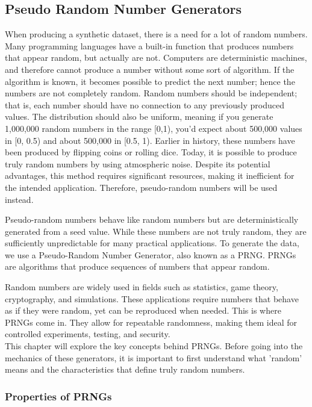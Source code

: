 \subsection{Pseudo Random Number Generators}
When producing a synthetic dataset, there is a need for a lot of random numbers. Many programming languages have a built-in function that produces numbers that appear random, but actually are not. Computers are deterministic machines, and therefore cannot produce a number without some sort of algorithm. If the algorithm is known, it becomes possible to predict the next number; hence the numbers are not completely random. Random numbers should be independent; that is, each number should have no connection to any previously produced values. The distribution should also be uniform, meaning if you generate 1,000,000 random numbers in the range [0,1), you'd expect about 500,000 values in [0, 0.5) and about 500,000 in [0.5, 1). Earlier in history, these numbers have been produced by flipping coins or rolling dice. Today, it is possible to produce truly random numbers by using atmospheric noise. Despite its potential advantages, this method requires significant resources, making it inefficient for the intended application. Therefore, pseudo-random numbers will be used instead.
\newline

\noindent Pseudo-random numbers behave like random numbers but are deterministically generated from a seed value. While
these numbers are not truly random, they are sufficiently unpredictable for many practical applications.
To generate the data, we use a Pseudo-Random Number Generator, also known as a PRNG.
PRNGs are algorithms that produce sequences of numbers that appear random.
\newline

\noindent Random numbers are widely used in fields such as statistics, game theory, cryptography, and simulations. These applications require numbers that behave
as if they were random, yet can be reproduced when needed. This is where
PRNGs come in. They allow for repeatable randomness, making them ideal for
controlled experiments, testing, and security.
\\
This chapter will explore the key concepts behind PRNGs. Before going into the
mechanics of these generators, it is important to first understand what ’random’
means and the characteristics that define truly random numbers.

\subsubsection{Properties of PRNGs}

